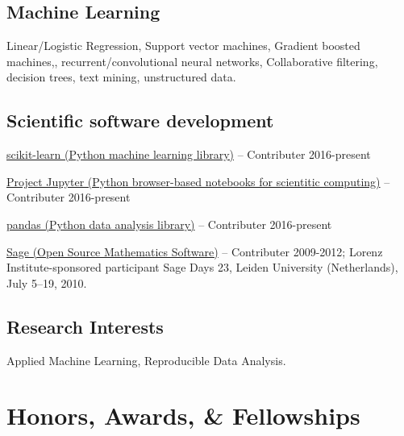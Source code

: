 \documentclass[10pt,a4paper]{article}
\renewenvironment{itemize}{
  \begin{list}{}{
    \setlength{\leftmargin}{1.5em}
    \setlength{\itemsep}{0.25em}
    \setlength{\parskip}{0pt}
    \setlength{\parsep}{0.25em}
  }
}{
  \end{list}
}
\begin{document}
\subsection*{Machine Learning}
\begin{itemize}
\item Linear/Logistic Regression, Support vector machines, Gradient boosted machines,, recurrent/convolutional neural networks,  Collaborative filtering,  decision trees, text mining, unstructured data.
\end{itemize}



 \subsection*{Scientific software development}
 \begin{itemize}
 \item \href{http://scikit-learn.org}{scikit-learn (Python machine learning library)} --
   Contributer 2016-present
 \item \href{http://jupyter.org}{Project Jupyter (Python browser-based notebooks for scientitic computing)} --
   Contributer 2016-present
 \item \href{http://pandas.pydata.org}{pandas (Python data analysis library)} --
   Contributer 2016-present
 \item \href{http://sage.org}{Sage (Open Source Mathematics Software)} --
   Contributer 2009-2012; Lorenz Institute-sponsored participant Sage Days 23, Leiden University (Netherlands), July 5--19, 2010.
 \end{itemize}



\subsection*{Research Interests}
\begin{itemize}
\item Applied Machine Learning, Reproducible Data Analysis.
\end{itemize}

\section*{Honors, Awards, \& Fellowships}
\end{document}
